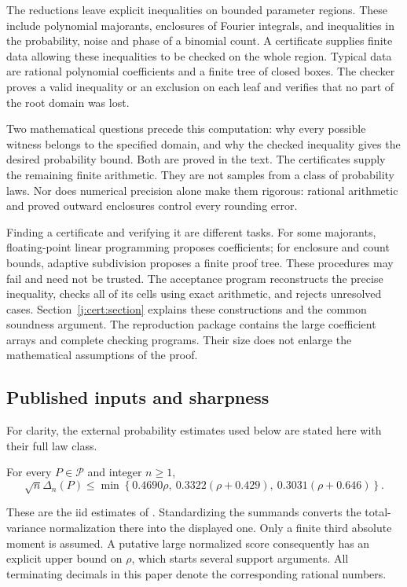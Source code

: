 The reductions leave explicit inequalities on bounded parameter
regions. These include polynomial majorants, enclosures of Fourier
integrals, and inequalities in the probability, noise and phase of a
binomial count. A certificate supplies finite data allowing these
inequalities to be checked on the whole region. Typical data are
rational polynomial coefficients and a finite tree of closed boxes.
The checker proves a valid inequality or an exclusion on each leaf
and verifies that no part of the root domain was lost.

Two mathematical questions precede this computation: why every
possible witness belongs to the specified domain, and why the checked
inequality gives the desired probability bound. Both are proved in
the text. The certificates supply the remaining finite arithmetic.
They are not samples from a class of probability laws. Nor does
numerical precision alone make them rigorous: rational arithmetic and
proved outward enclosures control every rounding error.

Finding a certificate and verifying it are different tasks. For some
majorants, floating-point linear programming proposes coefficients;
for enclosure and count bounds, adaptive subdivision proposes a
finite proof tree. These procedures may fail and need not be trusted.
The acceptance program reconstructs the precise inequality, checks
all of its cells using exact arithmetic, and rejects unresolved cases.
Section~\ref{j:cert:section} explains these constructions and the
common soundness argument. The reproduction package contains the
large coefficient arrays and complete checking programs. Their size
does not enlarge the mathematical assumptions of the proof.

\subsection{Published inputs and sharpness}

For clarity, the external probability estimates used below are stated
here with their full law class.
\begin{proposition}\label{j:external:affine}
For every $P\in\mathcal P$ and integer $n\ge1$,
\[
 \sqrt n\Delta_n(P)\le
 \min\left\{0.4690\rho,\ 0.3322(\rho+0.429),\
                         0.3031(\rho+0.646)\right\}.
\]
\end{proposition}
These are the iid estimates of \citet{Shevtsova2013}. Standardizing
the summands converts the total-variance normalization there into the
displayed one. Only a finite third absolute moment is assumed. A
putative large normalized score consequently has an explicit upper
bound on $\rho$, which starts several support arguments. All
terminating decimals in this paper denote the corresponding rational
numbers.

